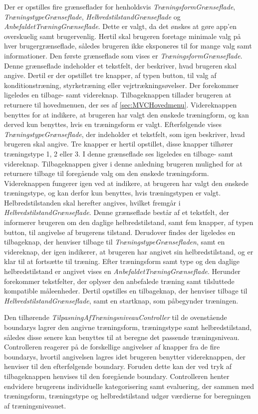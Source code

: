 \noindent
Der er opstilles fire grænseflader for henholdsvis \textit{TræningsformGrænseflade}, \textit{TræningstypeGrænseflade}, \textit{HelbredstilstandGrænseflade} og \textit{AnbefaldetTræningGrænseflade}. Dette er valgt, da det ønskes at gøre app’en overskuelig samt brugervenlig. Hertil skal brugeren foretage minimale valg på hver brugergrænseflade, således brugeren ikke eksponeres til for mange valg samt informationer. 
Den første grænseflade som vises er \textit{TræningsformGrænseflade}. Denne grænseflade indeholder et tekstfelt, der beskriver, hvad brugeren skal angive. Dertil er der opstillet tre knapper, af typen button, til valg af konditionstræning, styrketræning eller vejrtrækningsøvelser. Der forekommer ligeledes en tilbage- samt videreknap. Tilbageknappen tillader brugeren at returnere til hovedmenuen, der ses af \autoref{sec:MVCHovedmenu}. Videreknappen benyttes for at indikere, at brugeren har valgt den ønskede træningform, og kan derved kun benyttes, hvis en træningsform er valgt. 
Efterfølgende vises \textit{TræningstypeGrænseflade}, der indeholder et tekstfelt, som igen beskriver, hvad brugeren skal angive. Tre knapper er hertil opstillet, disse knapper tilhører træningstype 1, 2 eller 3. I denne grænseflade ses ligeledes en tilbage- samt videreknap. Tilbageknappen giver i denne anledning brugeren mulighed for at returnere tilbage til  foregående valg om den ønskede træningsform. Videreknappen fungerer igen ved at indikere, at brugeren har valgt den ønskede træningstype, og kan derfor kun benyttes, hvis træningstypen er valgt. 
Helbredstilstanden skal herefter angives, hvilket fremgår i \textit{HelbredstilstandGrænseflade}. Denne grænseflade består af et tekstfelt, der informerer brugeren om den daglige helbredstilstand, samt fem knapper, af typen button, til angivelse af brugerens tilstand. Derudover findes der ligeledes en tilbageknap, der henviser tilbage til \textit{TræningstypeGrænsefladen}, samt en videreknap, der igen indikerer, at brugeren har angivet sin helbredstilstand, og er klar til at fortsætte til træning. 
Efter træningsform samt type og den daglige helbredstilstand er angivet vises en \textit{AnbefaldetTræningGrænseflade}. Herunder forekommer tekstfelter, der oplyser den anbefalede træning samt tilsluttede kompatible måleenheder. Dertil opstilles en tilbageknap, der henviser tilbage til \textit{HelbredstilstandGrænseflade}, samt en startknap, som påbegynder træningen. 

Den tilhørende \textit{TilpasningAfTræningsniveauController} til de ovenstående boundarys lagrer den angivne træningsform, træningstype samt helbredstilstand, således disse senere kan benyttes til at beregne det passende træningsniveau. Controlleren reagerer på de forskellige angivelser af knapper fra de fire boundarys, hvortil angivelsen lagres idet brugeren benytter videreknappen, der henviser til den efterfølgende boundary. Foruden dette kan der ved tryk af tilbageknappen henvises til den foregående boundary. 
Controlleren henter endvidere brugerens individuelle kategorisering samt evaluering, der sammen med træningsform, træningstype og helbredstilstand udgør værdierne for beregningen af træningsniveauet. 


